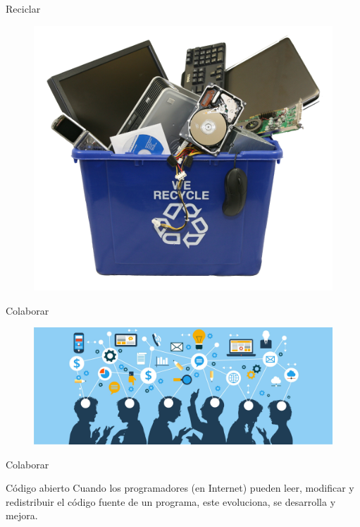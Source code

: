 \documentclass{beamer}
\begin{document}
		\begin{frame}{Reciclar}
			\begin{figure}
				\centering
				\includegraphics[scale=0.2]{recycle}
			\end{figure}
		\end{frame}	
		\begin{frame}{Colaborar}
			\begin{figure}
				\centering
				\includegraphics[width=\linewidth]{collaboration}
			\end{figure}
			
		\end{frame}	
		
		\begin{frame}{Colaborar}
			\begin{block}{Código abierto}
				Cuando los programadores (en Internet) pueden \textcolor{raspberry}{leer, modificar y redistribuir} el código fuente de un programa, este evoluciona, se desarrolla y mejora.
			\end{block}
		\end{frame}		
	
\end{document}

